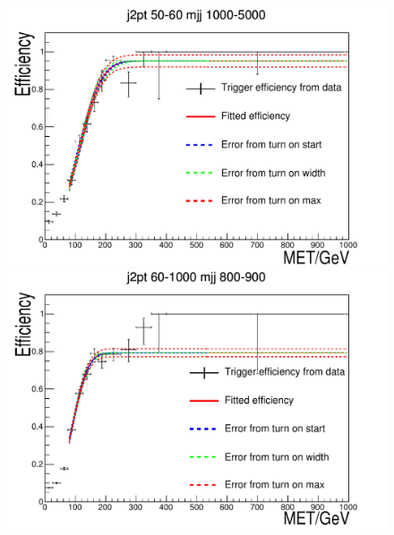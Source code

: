 \begin{figure}
\begin{center}
    \includegraphics[width=.6\largefigwidth]{plots/parked/trigfitplots/hData_MET_1D_35BC.pdf}
    \includegraphics[width=.6\largefigwidth]{plots/parked/trigfitplots/hData_MET_1D_43BC.pdf}


\end{center}
\end{figure}
